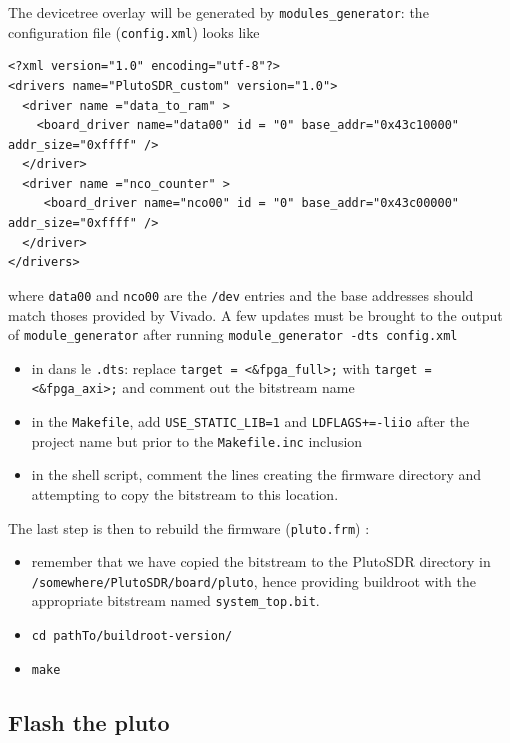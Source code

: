 \documentclass[12pt,oneside]{article}
\begin{document}
The devicetree overlay will be generated by {\tt modules\_generator}: the configuration
file ({\tt config.xml}) looks like
{\footnotesize
\begin{verbatim}
<?xml version="1.0" encoding="utf-8"?>
<drivers name="PlutoSDR_custom" version="1.0">
  <driver name ="data_to_ram" >
    <board_driver name="data00" id = "0" base_addr="0x43c10000" addr_size="0xffff" />
  </driver>
  <driver name ="nco_counter" >
     <board_driver name="nco00" id = "0" base_addr="0x43c00000" addr_size="0xffff" />
  </driver>
</drivers>
\end{verbatim}
}
where {\tt data00} and {\tt nco00} are the {\tt /dev} entries and the base addresses
should match thoses provided by Vivado. A few updates must be brought to the output
of {\tt module\_generator} after running {\tt module\_generator -dts config.xml}
\begin{itemize}
\item in dans le {\tt .dts}: replace \verb~target = <&fpga_full>;~ with \verb~target = <&fpga_axi>;~ 
and comment out the bitstream name
\item in the {\tt Makefile}, add {\tt USE\_STATIC\_LIB=1} and {\tt LDFLAGS+=-liio} after the project
name but prior to the {\tt Makefile.inc} inclusion
\item in the shell script, comment the lines creating the firmware directory and attempting to copy
the bitstream to this location.
\end{itemize}

The last step is then to rebuild the firmware ({\tt pluto.frm}) :

\begin{itemize}
	\item remember that we have copied the bitstream to the PlutoSDR
directory in \\
{\tt /somewhere/PlutoSDR/board/pluto}, hence providing buildroot with the appropriate
bitstream named {\tt system\_top.bit}.
	\item {\tt cd pathTo/buildroot-version/}
	\item {\tt make}
\end{itemize}

\subsection{Flash the pluto}
\end{document}
